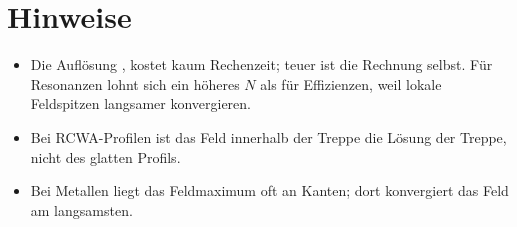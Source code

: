 \section{Hinweise}
\begin{itemize}
  \item Die Auflösung ,  kostet kaum Rechenzeit; teuer ist die Rechnung selbst. Für Resonanzen
        lohnt sich ein höheres $N$ als für Effizienzen, weil lokale Feldspitzen langsamer konvergieren.
  \item Bei RCWA-Profilen ist das Feld innerhalb der Treppe die Lösung der Treppe, nicht des glatten Profils.
  \item Bei Metallen liegt das Feldmaximum oft an Kanten; dort konvergiert das Feld am langsamsten.
\end{itemize}
